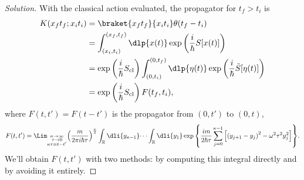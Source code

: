 \begin{proof}[Solution]
   With the classical action evaluated, the propagator for \(t_f > t_i\) is
   \begin{align*}
      K(x_ft_f; x_it_i) &= \braket{x_f t_f}{x_i t_i} \theta(t_f - t_i)\\
                        &=\int_{(x_i,t_i)}^{(x_f, t_f)} \dlp{x(t)} \exp\left(\frac{i}{\hbar}S[x(t)]\right)\\
                        &= \exp\left(\frac{i}{\hbar} S_{\mathrm{cl}}\right)\int_{(0, t_i)}^{(0, t_f)} \dlp{\eta(t)} \exp\left(\frac{i}{\hbar} \tilde{S}[\eta(t)]\right)\\
                        &=\exp\left(\frac{i}{\hbar} S_{\mathrm{cl}}\right) F(t_f, t_i),
   \end{align*}
   where \(F(t, t') = F(t - t')\) is the propagator from \((0,t')\) to \((0,t)\),
   \begin{equation*}
      F(t, t') = \Lim_{\substack{\kappa \to \infty\\ \tau \to 0\\ \kappa \tau = t - t'}}{\left(\frac{m}{2\pi i \hbar \tau}\right)^{\frac\kappa2}\int_{\mathbb{R}} \dli{y_{\kappa - 1}} \dots \int_{\mathbb{R}} \dli{y_1} \exp\left\{\frac{i m}{ 2 \hbar \tau} \sum_{j = 0}^{\kappa - 1} \left[\left(y_{j+1} - y_j\right)^2 - \omega^2\tau^2 y_j^2\right]\right\}}.
   \end{equation*}
   We'll obtain \(F(t, t')\) with two methods: by computing this integral directly and by avoiding it entirely.


\end{proof}
